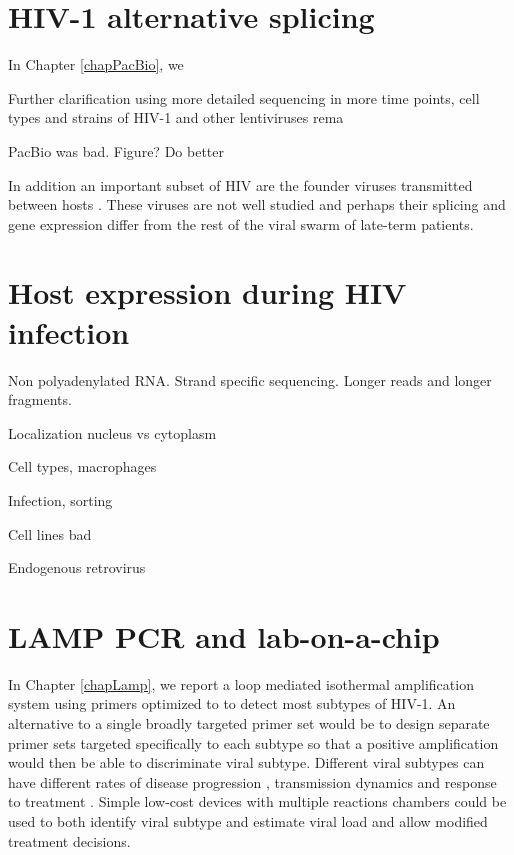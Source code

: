 \documentclass[../sherrill-Mix_thesis.tex]{subfiles}
\begin{document}
\section{HIV-1 alternative splicing}
In Chapter \ref{chapPacBio}, we 

Further clarification using more detailed sequencing in more time points, cell types and strains of HIV-1 and other lentiviruses rema

PacBio was bad. Figure? Do better

In addition an important subset of HIV are the founder viruses transmitted between hosts \citep{Keele2008,Salazar-Gonzalez2009}. These viruses are not well studied and perhaps their splicing and gene expression differ from the rest of the viral swarm of late-term patients.



\section{Host expression during HIV infection}



Non polyadenylated RNA. Strand specific sequencing. Longer reads and longer fragments.

Localization nucleus vs cytoplasm

Cell types, macrophages

Infection, sorting

Cell lines bad

Endogenous retrovirus

\section{LAMP PCR and lab-on-a-chip}
		In Chapter \ref{chapLamp}, we report a loop mediated isothermal amplification system using primers optimized to to detect most subtypes of HIV-1. An alternative to a single broadly targeted primer set would be to design separate primer sets targeted specifically to each subtype so that a positive amplification would then be able to discriminate viral subtype. Different viral subtypes can have different rates of disease progression \citep{Kanki1999,Kaleebu2002,Baeten2007,Kiwanuka2008}, transmission dynamics \citep{Renjifo2004,John-Stewart2005,Huang2007b} and response to treatment \citep{Snoeck2006,Easterbrook2010,Scherrer2011}. Simple low-cost devices with multiple reactions chambers could be used to both identify viral subtype and estimate viral load \citep{Liu2014a,Mauk2015} and allow modified treatment decisions.
		
\end{document}
